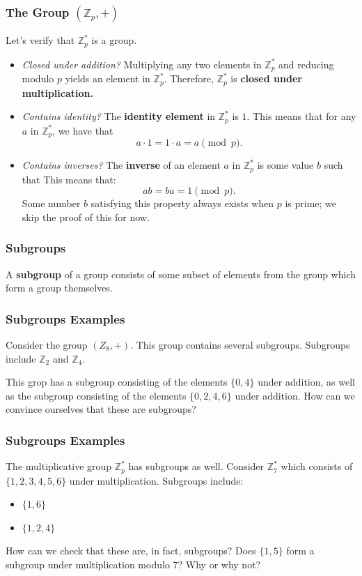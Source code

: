 \documentclass{beamer}
\newcommand{\<}{\langle}
\renewcommand{\>}{\rangle}
\newcommand{\Z}{\mathbb{Z}}
\begin{document}
\begin{frame}
\frametitle{The Group $(\mathbb{Z}_p, +)$}

Let's verify that $\Z_p^*$ is a group.
\begin{itemize}
\item \emph{Closed under addition?} Multiplying any two elements in $\Z_p^*$ and reducing modulo $p$ yields an element in $\Z_p^*$. Therefore, $\Z_p^*$ is \textbf{closed under multiplication.}
\item \emph{Contains identity?} The \textbf{identity element} in $\Z_p^*$ is $1$. This means that for any $a$ in $\Z_p^*$, we have that 
\[a\cdot 1 = 1\cdot a = a\pmod p.\]
\item {\emph{Contains inverses?}} The \textbf{inverse} of an element $a$ in $\Z_p^*$ is some value $b$ such that This means that:
\[
ab = ba = 1 \pmod p.
\]
Some number $b$ satisfying this property always exists when $p$ is prime; we skip the proof of this for now.
\end{itemize}
\end{frame}


\begin{frame}
\frametitle{Subgroups}

A \textbf{subgroup} of a group consists of some subset of elements from the group which form a group themselves.
\end{frame}

\begin{frame}
\frametitle{Subgroups Examples}

Consider the group $(Z_8, +)$. This group contains several subgroups. Subgroups include $\Z_2$ and $\Z_4$. \newline

This grop has a subgroup consisting of the elements $\{0, 4\}$ under addition, as well as the subgroup consisting of the elements $\{0, 2, 4, 6\}$ under addition. How can we convince ourselves that these are subgroups?
\end{frame}

\begin{frame}
\frametitle{Subgroups Examples}

The multiplicative group $\Z_p^*$ has subgroups as well. Consider $\Z_7^*$ which consists of $\{1, 2, 3, 4, 5, 6\}$ under multiplication. Subgroups include:
\begin{itemize}
\item $\{1,6\}$ 
\item $\{1, 2, 4\}$
\end{itemize}
How can we check that these are, in fact, subgroups? Does $\{1, 5\}$ form a subgroup under multiplication modulo $7$? Why or why not?
\end{frame}
\end{document}
